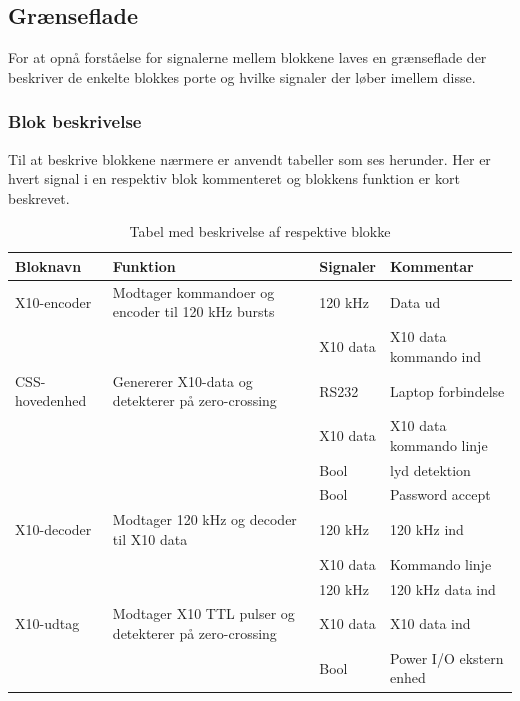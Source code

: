\clearpage
\newpage

\begin{table}[H] %
\subsection{Grænseflade}
For at opnå forståelse for signalerne mellem blokkene laves en grænseflade der beskriver de enkelte blokkes porte og hvilke signaler der løber imellem disse.

\subsubsection{Blok beskrivelse}
Til at beskrive blokkene nærmere er anvendt tabeller som ses herunder. Her er hvert signal i en respektiv blok kommenteret og blokkens funktion er kort beskrevet. 

\caption{Tabel med beskrivelse af respektive blokke}
\begin{small}
\begin{tabular}{|p{}|p{}|p{}|p{}|}
\hline
\textbf{Bloknavn} & \textbf{Funktion} & \textbf{Signaler} & \textbf{Kommentar} \\ \hline

X10-encoder & Modtager kommandoer og encoder til 120 kHz bursts & 120 kHz & Data ud \\ \cline{3-4}	
& & X10 data & X10 data kommando ind \\ \hline

CSS-hovedenhed & Genererer X10-data og detekterer på zero-crossing & RS232 & Laptop forbindelse \\ \cline{3-4}
& & X10 data & X10 data kommando linje \\ \cline{3-4}
& & Bool & lyd detektion \\ \cline{3-4}
& & Bool & Password accept \\ \hline

X10-decoder & Modtager 120 kHz og decoder til X10 data & 120 kHz & 120 kHz ind \\ \cline{3-4}
& & X10 data & Kommando linje \\ \cline{3-4}
& & 120 kHz & 120 kHz data ind \\ \hline

X10-udtag & Modtager X10 TTL pulser og detekterer på zero-crossing & X10 data & X10 data ind \\ \cline{3-4}
&& Bool & Power I/O ekstern enhed \\ \hline 
\end{tabular}
\end{small}
\label{table:Bloktabel}
\end{table}

